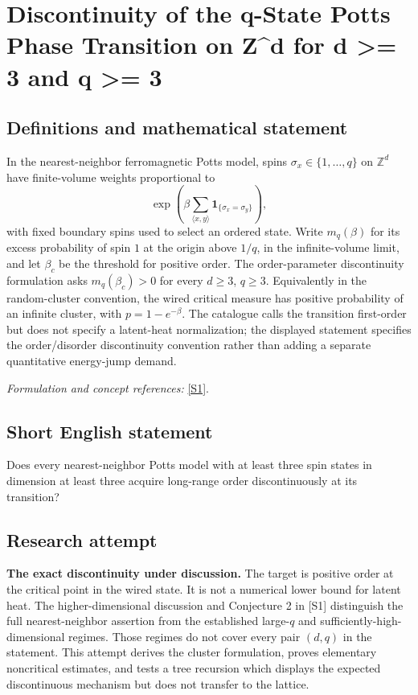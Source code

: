 \documentclass[11pt]{article}
\begin{document}
\section*{\texorpdfstring{Discontinuity of the q-State Potts Phase Transition on Z\textasciicircum{}d for d >= 3 and q >= 3}{Discontinuity of the q-State Potts Phase Transition on Z\textasciicircum{}d for d >= 3 and q >= 3}}\label{333}
\subsection{Definitions and mathematical statement}
In the nearest-neighbor ferromagnetic Potts model, spins $\sigma_x\in\{1,\ldots,q\}$ on ${\mathbb{Z}}^d$ have finite-volume weights proportional to
\[
 \exp\!\left(\beta\sum_{\langle x,y\rangle}
 \mathbf1_{\{\sigma_x=\sigma_y\}}\right),
\]
with fixed boundary spins used to select an ordered state. Write $m_q(\beta)$ for its excess probability of spin $1$ at the origin above $1/q$, in the infinite-volume limit, and let $\beta_c$ be the threshold for positive order. The order-parameter discontinuity formulation asks $m_q(\beta_c)>0$ for every $d\ge3$, $q\ge3$. Equivalently in the random-cluster convention, the wired critical measure has positive probability of an infinite cluster, with $p=1-e^{-\beta}$. The catalogue calls the transition first-order but does not specify a latent-heat normalization; the displayed statement specifies the order/disorder discontinuity convention rather than adding a separate quantitative energy-jump demand.
\par\smallskip\textit{Formulation and concept references:} \href{https://ar5iv.labs.arxiv.org/html/1707.00520}{[S1]}.

\subsection{Short English statement}
Does every nearest-neighbor Potts model with at least three spin states in dimension at least three acquire long-range order discontinuously at its transition?
\subsection{Research attempt}
\textbf{The exact discontinuity under discussion.}
The target is positive order at the critical point in the wired state.  It is
not a numerical lower bound for latent heat.  The higher-dimensional discussion
and Conjecture 2 in [S1] distinguish the full nearest-neighbor assertion from
the established large-$q$ and sufficiently-high-dimensional regimes.  Those
regimes do not cover every pair $(d,q)$ in the statement.  This attempt derives
the cluster formulation, proves elementary noncritical estimates, and tests a
tree recursion which displays the expected discontinuous mechanism but does
not transfer to the lattice.
\end{document}
